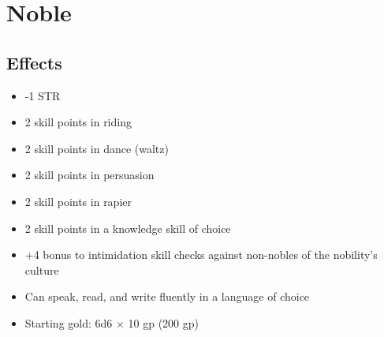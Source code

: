 \section{Noble}\label{background:noble}

\subsection{Effects}
\begin{itemize}
    \item -1 STR
    \item 2 skill points in riding
    \item 2 skill points in dance (waltz)
    \item 2 skill points in persuasion
    \item 2 skill points in rapier
    \item 2 skill points in a knowledge skill of choice
    \item +4 bonus to intimidation skill checks against non-nobles of the
        nobility's culture
    \item Can speak, read, and write fluently in a language of choice
    \item Starting gold: 6d6 $\times$ 10 gp (200 gp)
\end{itemize}

